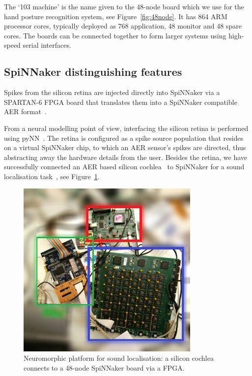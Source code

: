 The `103 machine' is the name given to the 48-node board which we use for the hand posture recognition system, see Figure~\ref{fig:48node}.
It has 864 ARM processor cores, typically deployed as 768 application, 48 monitor and 48 spare cores. 
The boards can be connected together to form larger systems using high-speed serial interfaces. 


\subsection{SpiNNaker distinguishing features}
Spikes from the silicon retina are injected directly into SpiNNaker via a SPARTAN-6 FPGA board that translates them into a SpiNNaker compatible AER format~\cite{appnote8}. 

From a neural modelling point of view, interfacing the silicon retina is performed using pyNN~\cite{davison2008pynn}. 
The retina is configured as a spike source population that resides on a virtual SpiNNaker chip, to which an AER sensor's spikes are directed, thus abstracting away the hardware details from the user\cite{galluppi2012real}.
Besides the retina, we have successfully connected an AER based silicon cochlea~\cite{5537164} to SpiNNaker for a sound localisation task~\cite{6706931}, see Figure~\ref{fig:sound}.

\begin{figure}
	\centering
	\includegraphics[width=0.8\textwidth]{pics/photooutline_blurred.jpg}
	\caption{Neuromorphic platform for sound localisation: a silicon cochlea connects to a 48-node SpiNNaker board via a FPGA.}
	\label{fig:sound}
\end{figure}

